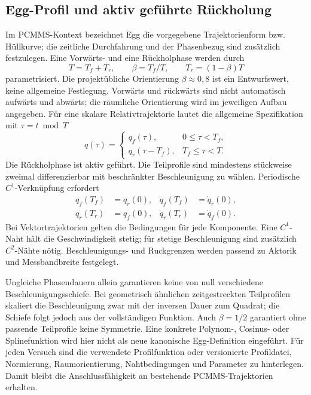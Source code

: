 \documentclass[11pt,a4paper]{article}
\begin{document}
\subsection{Egg-Profil und aktiv geführte Rückholung}
Im PCMMS-Kontext bezeichnet Egg die vorgegebene Trajektorienform bzw. Hüllkurve; die zeitliche Durchfahrung und der Phasenbezug sind zusätzlich festzulegen. Eine Vorwärts- und eine Rückholphase werden durch
\begin{equation}
T=T_f+T_r,\qquad \beta=T_f/T,\qquad T_r=(1-\beta)T
\end{equation}
parametrisiert. Die projektübliche Orientierung $\beta\approx0{,}8$ ist ein Entwurfswert, keine allgemeine Festlegung. Vorwärts und rückwärts sind nicht automatisch aufwärts und abwärts; die räumliche Orientierung wird im jeweiligen Aufbau angegeben.
Für eine skalare Relativtrajektorie lautet die allgemeine Spezifikation mit $\tau=t\bmod T$
\begin{equation}
q(\tau)=\begin{cases}q_f(\tau),&0\le\tau<T_f,\\q_r(\tau-T_f),&T_f\le\tau<T.\end{cases}
\end{equation}
Die Rückholphase ist aktiv geführt. Die Teilprofile sind mindestens stückweise zweimal differenzierbar mit beschränkter Beschleunigung zu wählen. Periodische $C^1$-Verknüpfung erfordert
\begin{align}
q_f(T_f)&=q_r(0),&\dot q_f(T_f)&=\dot q_r(0),\\
q_r(T_r)&=q_f(0),&\dot q_r(T_r)&=\dot q_f(0).
\end{align}
Bei Vektortrajektorien gelten die Bedingungen für jede Komponente. Eine $C^1$-Naht hält die Geschwindigkeit stetig; für stetige Beschleunigung sind zusätzlich $C^2$-Nähte nötig. Beschleunigungs- und Ruckgrenzen werden passend zu Aktorik und Messbandbreite festgelegt.

Ungleiche Phasendauern allein garantieren keine von null verschiedene Beschleunigungsschiefe. Bei geometrisch ähnlichen zeitgestreckten Teilprofilen skaliert die Beschleunigung zwar mit der inversen Dauer zum Quadrat; die Schiefe folgt jedoch aus der vollständigen Funktion. Auch $\beta=1/2$ garantiert ohne passende Teilprofile keine Symmetrie.
Eine konkrete Polynom-, Cosinus- oder Splinefunktion wird hier nicht als neue kanonische Egg-Definition eingeführt. Für jeden Versuch sind die verwendete Profilfunktion oder versionierte Profildatei, Normierung, Raumorientierung, Nahtbedingungen und Parameter zu hinterlegen. Damit bleibt die Anschlussfähigkeit an bestehende PCMMS-Trajektorien erhalten.
\end{document}
